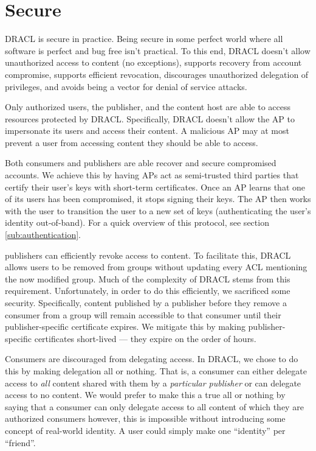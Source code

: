 \documentclass[pdftex,12pt,a4papaer]{report}
\begin{document}

\section{Secure}
\label{sub:secure}

DRACL is secure in practice. Being secure in some perfect world where all
software is perfect and bug free isn't practical. To this end, DRACL doesn't
allow unauthorized access to content (no exceptions), supports recovery from
account compromise, supports efficient revocation, discourages unauthorized
delegation of privileges, and avoids being a vector for denial of service
attacks.

Only authorized users, the publisher, and the content host are able to
access resources protected by DRACL\@. Specifically, DRACL doesn't allow the AP
to impersonate its users and access their content. A malicious AP may at most
prevent a user from accessing content they should be able to access.

Both consumers and publishers are able recover and secure compromised
accounts. We achieve this by having APs act as semi-trusted third parties that
certify their user's keys with short-term certificates. Once an AP learns that
one of its users has been compromised, it stops signing their keys. The AP then
works with the user to transition the user to a new set of keys (authenticating
the user's identity out-of-band). For a quick overview of this protocol, see
section \ref{sub:authentication}.

publishers can efficiently revoke access to content. To facilitate this,
DRACL allows users to be removed from groups without updating every ACL
mentioning the now modified group. Much of the complexity of DRACL stems from
this requirement. Unfortunately, in order to do this efficiently, we sacrificed
some security. Specifically, content published by a publisher before they
remove a consumer from a group will remain accessible to that consumer until
their publisher-specific certificate expires. We mitigate this by making
publisher-specific certificates short-lived --- they expire on the order of hours.

Consumers are discouraged from delegating access. In DRACL, we chose to do this
by making delegation all or nothing. That is, a consumer can either delegate
access to \emph{all} content shared with them by a \emph{particular publisher} or can delegate access to no content. We would prefer to make this a true
all or nothing by saying that a consumer can only delegate access to all content
of which they are authorized consumers however, this is impossible without
introducing some concept of real-world identity. A user could simply make one
``identity'' per ``friend''. 
\end{document}
